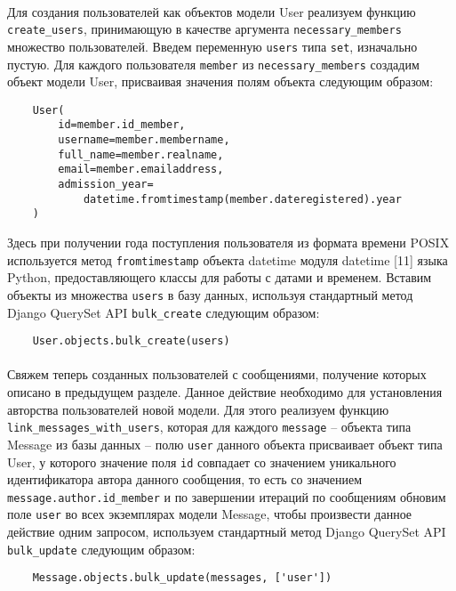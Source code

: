 \documentclass[12pt, a4paper, oneside]{article}
\begin{document}
\paragraph{}
Для создания пользователей как объектов модели User реализуем функцию \texttt{create\_users}, принимающую в качестве аргумента \texttt{necessary\_members} множество пользователей. Введем переменную \texttt{users} типа \texttt{set}, изначально пустую. Для каждого пользователя \texttt{member} из \texttt{necessary\_members} создадим объект модели User, присваивая значения полям объекта следующим образом:
\begin{verbatim}
    User(
        id=member.id_member,
        username=member.membername,
        full_name=member.realname,
        email=member.emailaddress,
        admission_year=
            datetime.fromtimestamp(member.dateregistered).year
    )
\end{verbatim}
Здесь при получении года поступления пользователя из формата времени POSIX используется метод \texttt{fromtimestamp} объекта datetime модуля datetime [11] языка Python, предоставляющего классы для работы с датами и временем. Вставим объекты из множества \texttt{users} в базу данных, используя стандартный метод Django QuerySet API \texttt{bulk\_create} следующим образом:
\begin{verbatim}
    User.objects.bulk_create(users)
\end{verbatim}
\paragraph{}
Свяжем теперь созданных пользователей с сообщениями, получение которых описано в предыдущем разделе. Данное действие необходимо для установления авторства пользователей новой модели. Для этого реализуем функцию \texttt{link\_messages\_with\_users}, которая для каждого \texttt{message} – объекта типа Message из базы данных – полю \texttt{user} данного объекта присваивает объект типа User, у которого значение поля \texttt{id} совпадает со значением уникального идентификатора автора данного сообщения, то есть со значением \texttt{message.author.id\_member} и по завершении итераций по сообщениям обновим поле \texttt{user} во всех экземплярах модели Message, чтобы произвести данное действие одним запросом, используем стандартный метод Django QuerySet API \texttt{bulk\_update} следующим образом:
\begin{verbatim}
    Message.objects.bulk_update(messages, ['user'])
\end{verbatim}
\vspace{1cm}
\end{document}
